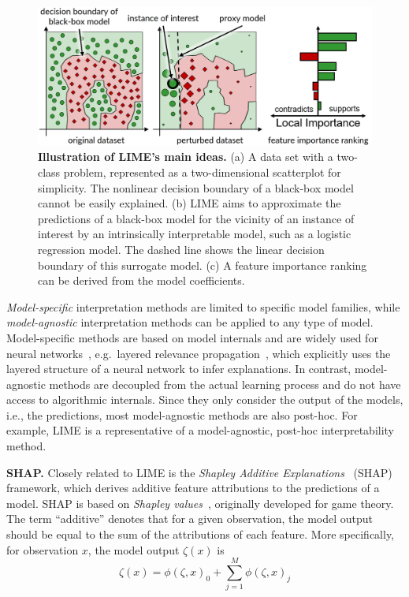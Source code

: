 \documentclass[
  oneside]{book}
\begin{document}
\begin{figure}

{\centering \includegraphics[width=1\linewidth]{figures/09-lime} 

}

\caption{\textbf{Illustration of LIME's main ideas.} (a) A data set with a two-class problem, represented as a two-dimensional scatterplot for simplicity. The nonlinear decision boundary of a black-box model cannot be easily explained. (b) LIME aims to approximate the predictions of a black-box model for the vicinity of an instance of interest by an intrinsically interpretable model, such as a logistic regression model. The dashed line shows the linear decision boundary of this surrogate model. (c) A feature importance ranking can be derived from the model coefficients.}\label{fig:09-lime}
\end{figure}

\emph{Model-specific} interpretation methods are limited to specific model families, while \emph{model-agnostic} interpretation methods can be applied to any type of model.
Model-specific methods are based on model internals and are widely used for neural networks~\autocite{samek2020toward}, e.g.~layered relevance propagation~\autocite{bach2015pixel}, which explicitly uses the layered structure of a neural network to infer explanations.
In contrast, model-agnostic methods are decoupled from the actual learning process and do not have access to algorithmic internals.
Since they only consider the output of the models, i.e., the predictions, most model-agnostic methods are also post-hoc.
For example, LIME is a representative of a model-agnostic, post-hoc interpretability method.

\textbf{SHAP.} Closely related to LIME is the \emph{Shapley Additive Explanations}~\autocite{Lundberg:SHAP2017} (SHAP) framework, which derives additive feature attributions to the predictions of a model.
SHAP is based on \emph{Shapley values}~\autocite{lipovetsky2001analysis,vstrumbelj2014explaining,shapley1953value}, originally developed for game theory.
The term ``additive'' denotes that for a given observation, the model output should be equal to the sum of the attributions of each feature.
More specifically, for observation \(x\), the model output \(\zeta(x)\) is
\begin{equation}
\zeta(x)=\phi(\zeta,x)_0 + \sum_{j=1}^M \phi(\zeta,x)_j
\label{eq:shap-additivity}
\end{equation}
\end{document}
